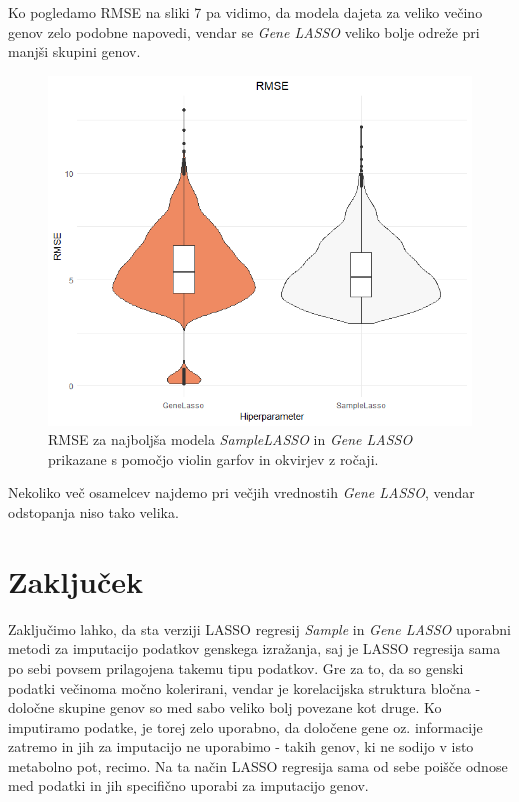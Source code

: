 \documentclass[onecolumn]{report}
\begin{document}
Ko pogledamo RMSE na sliki 7 pa vidimo, da modela dajeta za veliko večino genov zelo podobne napovedi, vendar se \emph{Gene LASSO} veliko bolje odreže pri manjši skupini genov.

\newpage

\begin{figure}[!htb]
	\centering
	\includegraphics[width=1\linewidth]{fig/best_rmse.png}
	\caption{RMSE za najboljša modela \emph{SampleLASSO} in \emph{Gene LASSO} prikazane s pomočjo violin garfov in okvirjev z ročaji.}
	\label{fig:vqvae}
\end{figure}

Nekoliko več osamelcev najdemo pri večjih vrednostih  \emph{Gene LASSO}, vendar odstopanja niso tako velika. 

\section{Zaključek}

Zaključimo lahko, da sta verziji LASSO regresij \emph{Sample} in \emph{Gene LASSO} uporabni metodi za imputacijo podatkov genskega izražanja, saj je LASSO regresija sama po sebi povsem prilagojena takemu tipu podatkov. Gre za to, da so genski podatki večinoma močno kolerirani, vendar je korelacijska struktura bločna - določne skupine genov so med sabo veliko bolj povezane kot druge. Ko imputiramo podatke, je torej zelo uporabno, da določene gene oz. informacije zatremo in jih za imputacijo ne uporabimo - takih genov, ki ne sodijo v isto metabolno pot, recimo. Na ta način LASSO regresija sama od sebe poišče odnose med podatki in jih specifično uporabi za imputacijo genov.
\end{document}
